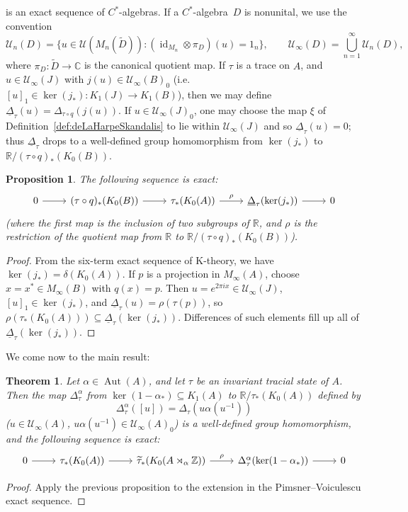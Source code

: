 \documentclass{book}
\newtheorem{proposition}[definition]{Proposition}
\newtheorem{theorem}[definition]{Theorem}
\def\cstar{\(C^*\)-algebra}
\def\cstars{\(C^*\)-algebras}
\begin{document}
is an exact sequence of \cstars. If a \cstar\ \(D\) is nonunital, we use the convention
\[
  \mathcal U_n(D)
  =
  \bigl\{u\in\mathcal U(M_n(\widetilde D)):
  (\operatorname{id}_{M_n}\otimes\pi_D)(u)=1_n\bigr\},
  \qquad
  \mathcal U_\infty(D)=\bigcup_{n=1}^\infty\mathcal U_n(D),
\]
where \(\pi_D:\widetilde D\to\mathbb C\) is the canonical quotient map.
If \(\tau\) is a trace on \(A\), and \(u\in\mathcal{U}_\infty(J)\)
with \(j(u)\in\mathcal{U}_\infty(B)_0\) (i.e. \([u]_1\in\ker(j_*):K_1(J)\rightarrow K_1(B)\)),
then we may define \(\underline{\Delta}_\tau(u)=\Delta_{\tau\circ q}(j(u))\).
If \(u\in\mathcal{U}_\infty(J)_0\), one may choose the map \(\xi\) of Definition~\ref{def:deLaHarpeSkandalis} to
lie within \(\mathcal{U}_\infty(J)\) and so \(\underline{\Delta}_\tau(u)=0\);
thus \(\underline{\Delta}_\tau\) drops to a well-defined group homomorphism from
\(\ker(j_*)\) to \(\mathbb{R}/(\tau\circ q)_*(K_0(B))\).
\begin{proposition}
  The following sequence is exact:
  \[
    \begin{tikzcd}
      0\arrow[r]&(\tau\circ q)_*(K_0(B))\arrow[r]&\tau_*(K_0(A))\arrow[r,"\rho"]&\underline{\Delta}_\tau(\ker(j_*))\arrow[r]&0
    \end{tikzcd}
  \]
  (where the first map is the inclusion of two subgroups of \(\mathbb{R}\), and \(\rho\) is the
  restriction of the quotient map from \(\mathbb{R}\) to \(\mathbb{R}/(\tau\circ q)_*(K_0(B))\)).
\end{proposition}
\begin{proof}
  From the six-term exact sequence of K-theory, we have \(\ker(j_*)=\delta(K_0(A))\).
  If \(p\) is a projection in \(M_\infty(A)\), choose \(x=x^*\in M_\infty(B)\) with 
  \(q(x)=p\). Then \(u=e^{2\pi ix}\in\mathcal U_\infty(J)\), \([u]_1\in\ker(j_*)\), and
  \(\underline{\Delta}_\tau(u)=\rho(\tau(p))\), 
  so \(\rho(\tau_*(K_0(A)))\subseteq\underline{\Delta}_\tau(\ker(j_*))\).
  Differences of such elements fill up all of \(\underline{\Delta}_\tau(\ker(j_*))\).
\end{proof}
We come now to the main result:
\begin{theorem}\label{thm:traceRangeCrossedProduct}
  Let \(\alpha\in\operatorname{Aut}(A)\), and let \(\tau\) be an invariant tracial 
  state of \(A\). Then the map \(\Delta_\tau^\alpha\) from \(\ker(1-\alpha_*)\subseteq K_1(A)\)
  to \(\mathbb{R}/\tau_*(K_0(A))\) defined by
  \[
    \Delta_\tau^\alpha([u])=\Delta_\tau(u\alpha(u^{-1})) 
  \]
  (\(u\in\mathcal{U}_\infty(A)\), \(u\alpha(u^{-1})\in\mathcal{U}_\infty(A)_0\)) is a well-defined group homomorphism,
  and the following sequence is exact:
  \[
    \begin{tikzcd}
      0\arrow[r]&\tau_*(K_0(A))\arrow[r]&\widetilde{\tau}_*(K_0(A\rtimes_\alpha\mathbb{Z}))\arrow[r,"\rho"]&\Delta_\tau^\alpha(\ker(1-\alpha_*))\arrow[r]&0
    \end{tikzcd}
  \]
\end{theorem}
\begin{proof}
  Apply the previous proposition to the extension in the Pimsner--Voiculescu exact sequence.
\end{proof}
\end{document}
